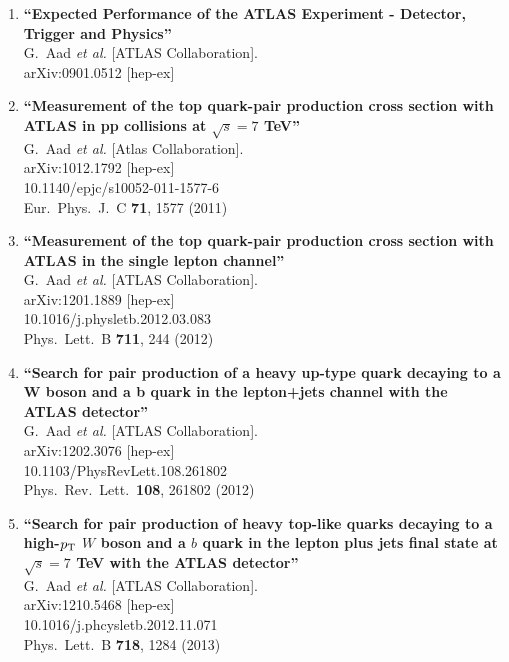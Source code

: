 \documentclass[12pt]{article}
\begin{document}
\begin{enumerate}
\item
 {\bf ``Expected Performance of the ATLAS Experiment - Detector, Trigger and Physics''}
  \\{}G.~Aad {\it et al.}  [ATLAS Collaboration].
  \\{}arXiv:0901.0512 [hep-ex]

\item 
  {\bf ``Measurement of the top quark-pair production cross section with ATLAS in pp collisions at $\sqrt{s}=7$ TeV''}
  \\{}G.~Aad {\it et al.}  [Atlas Collaboration].
  \\{}arXiv:1012.1792 [hep-ex]
  \\{}10.1140/epjc/s10052-011-1577-6
  \\{}Eur.\ Phys.\ J.\ C {\bf 71}, 1577 (2011)

\item
  {\bf ``Measurement of the top quark-pair production cross section with ATLAS in the single lepton channel''}
  \\{}G.~Aad {\it et al.}  [ATLAS Collaboration].
  \\{}arXiv:1201.1889 [hep-ex]
  \\{}10.1016/j.physletb.2012.03.083
  \\{}Phys.\ Lett.\ B {\bf 711}, 244 (2012)

\item
 {\bf ``Search for pair production of a heavy up-type quark decaying to a W boson and a b quark in the lepton+jets channel with the ATLAS detector''}
  \\{}G.~Aad {\it et al.}  [ATLAS Collaboration].
  \\{}arXiv:1202.3076 [hep-ex]
  \\{}10.1103/PhysRevLett.108.261802
  \\{}Phys.\ Rev.\ Lett.\  {\bf 108}, 261802 (2012)

\item
  {\bf ``Search for pair production of heavy top-like quarks decaying to a high-$p_{\rm T}$ $W$ boson and a $b$ quark in the lepton plus jets final state at $\sqrt{s}=7$ TeV with the ATLAS detector''}
  \\{}G.~Aad {\it et al.}  [ATLAS Collaboration].
  \\{}arXiv:1210.5468 [hep-ex]
    \\{}10.1016/j.phcysletb.2012.11.071
\\{}Phys.\ Lett.\ B {\bf 718}, 1284 (2013) 


\end{enumerate}
\end{document}
